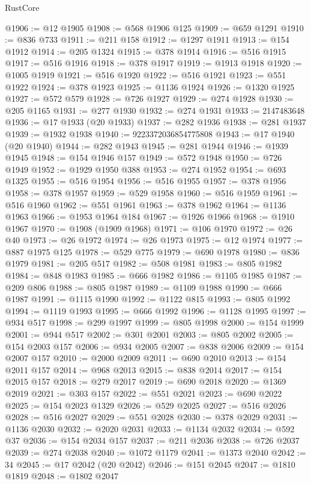 \begin{lexlean}{RustCore}
\begin{coremodule}
@1906 := @12 @1905
@1908 := @568 @1906 @125
@1909 := @659 @1291
@1910 := @836 @733
@1911 := @211 @158
@1912 := @1297 @1911
@1913 := @154 @1912
@1914 := @205 @1324
@1915 := @378 @1914
@1916 := @516 @1915
@1917 := @516 @1916
@1918 := @378 @1917
@1919 := @1913 @1918
@1920 := @1005 @1919
@1921 := @516 @1920
@1922 := @516 @1921
@1923 := @551 @1922
@1924 := @378 @1923
@1925 := @1136 @1924
@1926 := @1320 @1925
@1927 := @572 @579
@1928 := @726 @1927
@1929 := @274 @1928
@1930 := @205 @1165
@1931 := @277 @1930
@1932 := @274 @1931
@1933 := 2147483648
@1936 := @17 @1933 (@20 @1933)
@1937 := @282 @1936
@1938 := @281 @1937
@1939 := @1932 @1938
@1940 := 9223372036854775808
@1943 := @17 @1940 (@20 @1940)
@1944 := @282 @1943
@1945 := @281 @1944
@1946 := @1939 @1945
@1948 := @154 @1946 @157
@1949 := @572 @1948
@1950 := @726 @1949
@1952 := @1929 @1950 @388
@1953 := @274 @1952
@1954 := @693 @1325
@1955 := @516 @1954
@1956 := @516 @1955
@1957 := @378 @1956
@1958 := @378 @1957
@1959 := @529 @1958
@1960 := @516 @1959
@1961 := @516 @1960
@1962 := @551 @1961
@1963 := @378 @1962
@1964 := @1136 @1963
@1966 := @1953 @1964 @184
@1967 := @1926 @1966
@1968 := @1910 @1967
@1970 := @1908 (@1909 @1968)
@1971 := @106 @1970
@1972 := @26 @40
@1973 := @26 @1972
@1974 := @26 @1973
@1975 := @12 @1974
@1977 := @887 @1975 @125
@1978 := @529 @775
@1979 := @690 @1978
@1980 := @836 @1979
@1981 := @205 @517
@1982 := @508 @1981
@1983 := @805 @1982
@1984 := @848 @1983
@1985 := @666 @1982
@1986 := @1105 @1985
@1987 := @209 @806
@1988 := @805 @1987
@1989 := @1109 @1988
@1990 := @666 @1987
@1991 := @1115 @1990
@1992 := @1122 @815
@1993 := @805 @1992
@1994 := @1119 @1993
@1995 := @666 @1992
@1996 := @1128 @1995
@1997 := @934 @517
@1998 := @299 @1997
@1999 := @805 @1998
@2000 := @154 @1999
@2001 := @944 @517
@2002 := @301 @2001
@2003 := @805 @2002
@2005 := @154 @2003 @157
@2006 := @934 @2005
@2007 := @838 @2006
@2009 := @154 @2007 @157
@2010 := @2000 @2009
@2011 := @690 @2010
@2013 := @154 @2011 @157
@2014 := @968 @2013
@2015 := @838 @2014
@2017 := @154 @2015 @157
@2018 := @279 @2017
@2019 := @690 @2018
@2020 := @1369 @2019
@2021 := @303 @157
@2022 := @551 @2021
@2023 := @690 @2022
@2025 := @154 @2023 @1329
@2026 := @529 @2025
@2027 := @516 @2026
@2028 := @516 @2027
@2029 := @551 @2028
@2030 := @378 @2029
@2031 := @1136 @2030
@2032 := @2020 @2031
@2033 := @1134 @2032
@2034 := @592 @37
@2036 := @154 @2034 @157
@2037 := @211 @2036
@2038 := @726 @2037
@2039 := @274 @2038
@2040 := @1072 @1179
@2041 := @1373 @2040
@2042 := 34
@2045 := @17 @2042 (@20 @2042)
@2046 := @151 @2045
@2047 := @1810 @1819
@2048 := @1802 @2047

\end{coremodule}
\end{lexlean}
